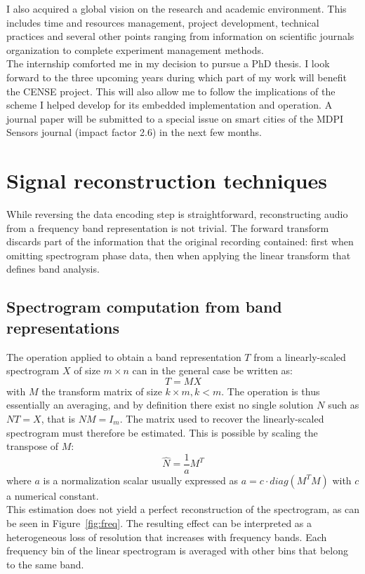 \documentclass[12pt,times,onecolumn]{article}
\begin{document}
I also acquired a global vision on the research and academic environment. This includes time and resources management, project development, technical practices and several other points ranging from information on scientific journals organization to complete experiment management methods.\\

The internship comforted me in my decision to pursue a PhD thesis. I look forward to the three upcoming years during which part of my work will benefit the CENSE project. This will also allow me to follow the implications of the scheme I helped develop for its embedded implementation and operation. A journal paper will be submitted to a special issue on smart cities of the MDPI Sensors journal (impact factor 2.6) in the next few months.

\clearpage
\appendix
\section{Signal reconstruction techniques}
\label{sigrec}
While reversing the data encoding step is straightforward, reconstructing audio from a frequency band representation is not trivial. The forward transform discards part of the information that the original recording contained: first when omitting spectrogram phase data, then when applying the linear transform that defines band analysis.
\subsection{Spectrogram computation from band representations}
The operation applied to obtain a band representation $T$ from a linearly-scaled spectrogram $X$ of size $m\times n$ can in the general case be written as:
\begin{equation}
T = MX
\end{equation}
with $M$ the transform matrix of size $k\times m, k<m$. The operation is thus essentially an averaging, and by definition there exist no single solution $N$ such as $NT = X$, that is $NM = I_m$. The matrix used to recover the linearly-scaled spectrogram must therefore be estimated. This is possible by scaling the transpose of $M$:
\begin{equation}
\hat{N} = \frac{1}{a}M^T
\end{equation}
where $a$ is a normalization scalar usually expressed as $a = c\cdot diag(M^TM)$ with $c$ a numerical constant.\\

This estimation does not yield a perfect reconstruction of the spectrogram, as can be seen in Figure~\ref{fig:freq}. The resulting effect can be interpreted as a heterogeneous loss of resolution that increases with frequency bands. Each frequency bin of the linear spectrogram is averaged with other bins that belong to the same band.
\end{document}
